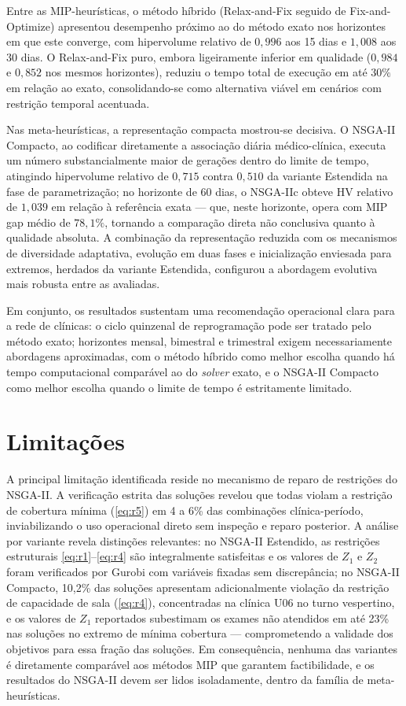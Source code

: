 Entre as MIP-heurísticas, o método híbrido (Relax-and-Fix seguido de Fix-and-Optimize) apresentou desempenho próximo ao do método exato nos horizontes em que este converge, com hipervolume relativo de $0{,}996$ aos 15 dias e $1{,}008$ aos 30 dias. O Relax-and-Fix puro, embora ligeiramente inferior em qualidade ($0{,}984$ e $0{,}852$ nos mesmos horizontes), reduziu o tempo total de execução em até $30\%$ em relação ao exato, consolidando-se como alternativa viável em cenários com restrição temporal acentuada.

Nas meta-heurísticas, a representação compacta mostrou-se decisiva. O NSGA-II Compacto, ao codificar diretamente a associação diária médico-clínica, executa um número substancialmente maior de gerações dentro do limite de tempo, atingindo hipervolume relativo de $0{,}715$ contra $0{,}510$ da variante Estendida na fase de parametrização; no horizonte de 60 dias, o NSGA-IIc obteve HV relativo de $1{,}039$ em relação à referência exata --- que, neste horizonte, opera com MIP gap médio de $78{,}1\%$, tornando a comparação direta não conclusiva quanto à qualidade absoluta. A combinação da representação reduzida com os mecanismos de diversidade adaptativa, evolução em duas fases e inicialização enviesada para extremos, herdados da variante Estendida, configurou a abordagem evolutiva mais robusta entre as avaliadas.

Em conjunto, os resultados sustentam uma recomendação operacional clara para a rede de clínicas: o ciclo quinzenal de reprogramação pode ser tratado pelo método exato; horizontes mensal, bimestral e trimestral exigem necessariamente abordagens aproximadas, com o método híbrido como melhor escolha quando há tempo computacional comparável ao do \textit{solver} exato, e o NSGA-II Compacto como melhor escolha quando o limite de tempo é estritamente limitado.

\section{Limitações}

A principal limitação identificada reside no mecanismo de reparo de restrições do NSGA-II. A verificação estrita das soluções revelou que todas violam a restrição de cobertura mínima (\ref{eq:r5}) em 4 a 6\% das combinações clínica-período, inviabilizando o uso operacional direto sem inspeção e reparo posterior. A análise por variante revela distinções relevantes: no NSGA-II Estendido, as restrições estruturais \ref{eq:r1}--\ref{eq:r4} são integralmente satisfeitas e os valores de $Z_1$ e $Z_2$ foram verificados por Gurobi com variáveis fixadas sem discrepância; no NSGA-II Compacto, 10{,}2\% das soluções apresentam adicionalmente violação da restrição de capacidade de sala (\ref{eq:r4}), concentradas na clínica U06 no turno vespertino, e os valores de $Z_1$ reportados subestimam os exames não atendidos em até 23\% nas soluções no extremo de mínima cobertura --- comprometendo a validade dos objetivos para essa fração das soluções. Em consequência, nenhuma das variantes é diretamente comparável aos métodos MIP que garantem factibilidade, e os resultados do NSGA-II devem ser lidos isoladamente, dentro da família de meta-heurísticas.

